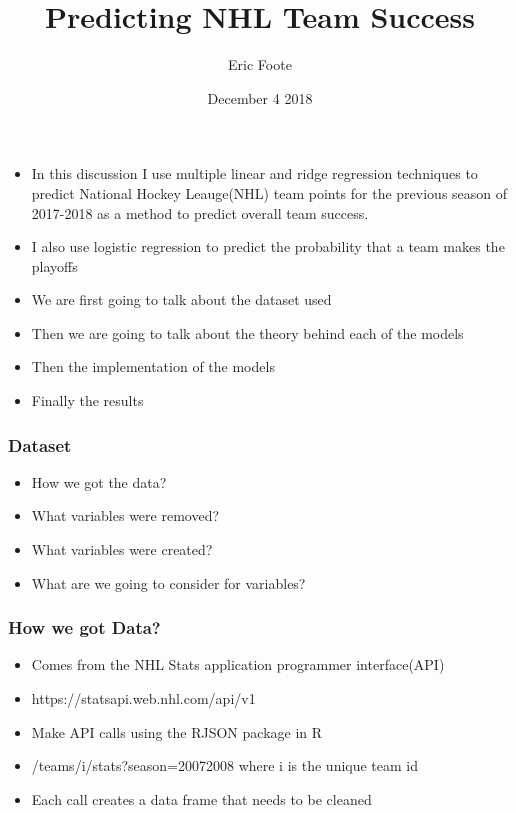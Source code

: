 \documentclass{beamer}
\title{Predicting NHL Team Success}
\author{Eric Foote}
\institute{UNBSJ}
\date{December 4 2018}
\begin{document}
	\begin{frame}
		\titlepage
	\end{frame}
\begin{frame}
\begin{itemize}
	\frametitle{Overview}
	\item In this discussion I use multiple linear and ridge regression techniques to predict National Hockey Leauge(NHL) team points for the previous season of 2017-2018 as a method to predict overall team success. 
	\item I also use logistic regression to predict the probability that a team makes the playoffs
\end{itemize}
\end{frame}
\begin{frame}
	\begin{itemize}
		\frametitle{What we are going to Discuss}
	\item We are first going to talk about the dataset used
	\item Then we are going to talk about the theory behind each of the models
	\item Then the implementation of the models
	\item Finally the results
	\end{itemize}
\end{frame}
\begin{frame}
	\frametitle{Dataset}
	\begin{itemize}
	\item How we got the data?
	\item What variables were removed?	
	\item What variables were created?
	\item What are we going to consider for variables?
	\end{itemize}
\end{frame}
\begin{frame}
	\frametitle{How we got Data?}
	\begin{itemize}
	\item Comes from the NHL Stats application programmer interface(API)
	\item https://statsapi.web.nhl.com/api/v1
	\item Make API calls using the RJSON package in R
	\item /teams/i/stats?season=20072008 where i is the unique team id
	\item Each call creates a data frame that needs to be cleaned
	\end{itemize}
\end{frame}
\end{document}
